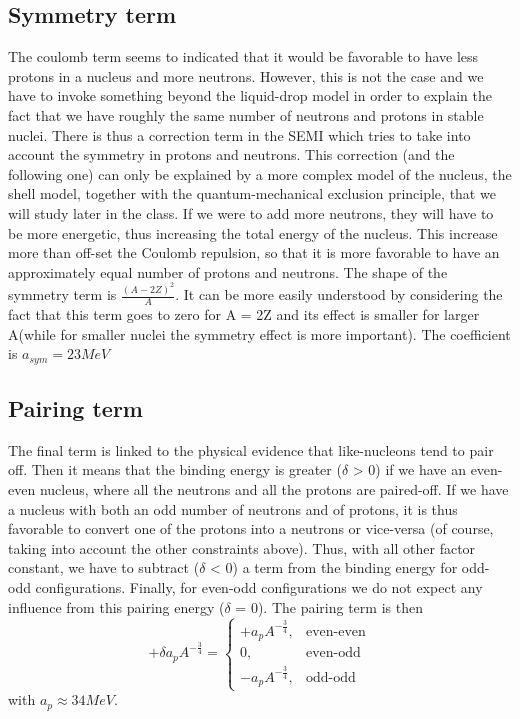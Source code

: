 \documentclass[11pt, a4paper]{article}
\begin{document}
\subsection*{Symmetry term}
The coulomb term seems to indicated that it would be favorable to have less protons in a nucleus and more neutrons. However, this is not the case and we have to invoke something beyond the liquid-drop model in order to explain the fact that we have roughly the same number of neutrons and protons in stable nuclei. There is thus a correction term in the SEMI which tries to take into account the symmetry in protons and neutrons. This correction (and the following one) can only be explained by a more complex model of the nucleus, the shell model, together with the quantum-mechanical exclusion principle, that we will study later in the class. If we were to add more neutrons, they will have to be more energetic, thus increasing the total energy of the nucleus. This increase more than off-set the Coulomb repulsion, so that it is more favorable to have an approximately equal number of protons and neutrons. The shape of the symmetry term is \(\frac{(A-2Z)^2}{A}\). It can be more easily understood by considering the fact that this term goes to zero for A = 2Z and its effect is smaller for larger A(while for smaller nuclei the symmetry effect is more important). The coefficient is $a_{sym}=23MeV$
\subsection*{Pairing term}
The final term is linked to the physical evidence that like-nucleons tend to pair off. Then it means that the binding energy is greater ($\delta$ > 0) if we have an even-even nucleus, where all the neutrons and all the protons are paired-off. If we have a nucleus with both an odd number of neutrons and of protons, it is thus favorable to convert one of the protons into a neutrons or vice-versa (of course, taking into account the other constraints above). Thus, with all other factor constant, we have to subtract ($\delta$ < 0) a term from the binding energy for odd-odd configurations. Finally, for even-odd configurations we do not expect any influence from this pairing energy ($\delta$ = 0). The pairing term is then
\begin{equation}
    +\delta a_p A^{-\frac{3}{4}}= 
    \begin{cases}
      +a_p A^{-\frac{3}{4}},& \text{even-even}\\
        0,              & \text{even-odd}\\
        -a_p A^{-\frac{3}{4}}, & \text{odd-odd }
    \end{cases} 
\end{equation}
with $a_p \approx 34MeV$. 
\newpage      
\end{document}

